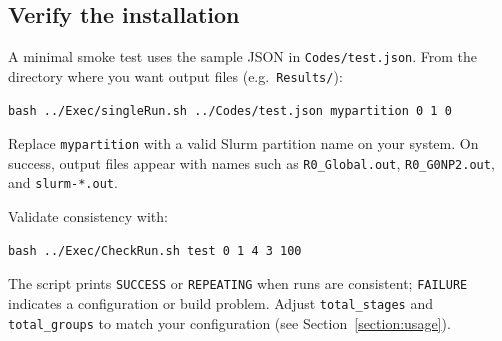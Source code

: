 \subsection{Verify the installation}

A minimal smoke test uses the sample JSON in \texttt{Codes/test.json}. From the directory where you want output files (e.g.\ \texttt{Results/}):

\begin{lstlisting}[style=bashstyle,caption={Smoke test with automatic Slurm allocation.},captionpos=b]
bash ../Exec/singleRun.sh ../Codes/test.json mypartition 0 1 0
\end{lstlisting}

Replace \texttt{mypartition} with a valid Slurm partition name on your system. On success, output files appear with names such as \texttt{R0\_Global.out}, \texttt{R0\_G0NP2.out}, and \texttt{slurm-*.out}.

Validate consistency with:

\begin{lstlisting}[style=bashstyle]
bash ../Exec/CheckRun.sh test 0 1 4 3 100
\end{lstlisting}

The script prints \texttt{SUCCESS} or \texttt{REPEATING} when runs are consistent; \texttt{FAILURE} indicates a configuration or build problem. Adjust \texttt{total\_stages} and \texttt{total\_groups} to match your configuration (see Section~\ref{section:usage}).
